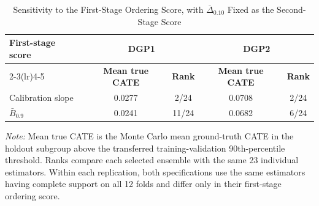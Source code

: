 \begin{table}[ht]
\centering
\caption{Sensitivity to the First-Stage Ordering Score, with $\overline{\Delta}_{0.10}$ Fixed as the Second-Stage Score}
\label{tab:first_stage_score_sensitivity}
\small
\setlength{\tabcolsep}{5pt}
\begin{tabular}{@{}lcccc@{}}
\toprule
\textbf{First-stage score} & \multicolumn{2}{c}{\textbf{DGP1}} & \multicolumn{2}{c}{\textbf{DGP2}} \\
\cmidrule(lr){2-3}\cmidrule(lr){4-5}
& \textbf{Mean true CATE} & \textbf{Rank} & \textbf{Mean true CATE} & \textbf{Rank} \\
\midrule
Calibration slope & 0.0277 & 2/24 & 0.0708 & 2/24 \\
$\bar B_{0.9}$ & 0.0241 & 11/24 & 0.0682 & 6/24 \\
\bottomrule
\end{tabular}
\begin{minipage}{0.95\linewidth}
\footnotesize\textit{Note:} Mean true CATE is the Monte Carlo mean ground-truth CATE in the holdout subgroup above the transferred training-validation 90th-percentile threshold. Ranks compare each selected ensemble with the same 23 individual estimators. Within each replication, both specifications use the same estimators having complete support on all 12 folds and differ only in their first-stage ordering score.
\end{minipage}
\end{table}
